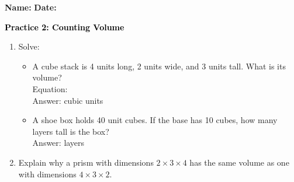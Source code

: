 \documentclass[12pt, letterpaper, fleqn]{article}
\newcommand{\blank}{\underline{\hspace{2.2cm}}}
\newcommand{\blanklong}{\underline{\hspace{6.5cm}}}
\begin{document}
\textbf{Name:} \underline{\hspace{5cm}}
\hfill
\textbf{Date:} \underline{\hspace{3cm}}\\

\begin{tcolorbox}[colback=customteal!20]
    \large\textcolor{black}{\textbf{Practice 2: Counting Volume}}
\end{tcolorbox}

\vspace{5mm}
\begin{enumerate}[itemsep=3cm, leftmargin=0.6cm]
\item Solve:
  \begin{itemize}[itemsep=1.5cm]
    \item A cube stack is 4 units long, 2 units wide, and 3 units tall. What is its volume? \\ Equation: \blanklong \\ Answer: \blank cubic units
    \item A shoe box holds 40 unit cubes. If the base has 10 cubes, how many layers tall is the box? \\ Answer: \blank layers
  \end{itemize}

\item Explain why a prism with dimensions $2 \times 3 \times 4$ has the same volume as one with dimensions $4 \times 3 \times 2$.
\end{enumerate}
\end{document}
